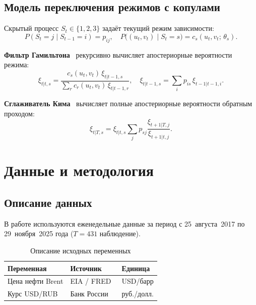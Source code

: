 \section{Модель переключения режимов с копулами}

Скрытый процесс $S_t \in \{1,2,3\}$ задаёт текущий режим зависимости:
\begin{equation}
  P(S_t = j \mid S_{t-1} = i) = p_{ij}, \quad
  P\bigl((u_t, v_t) \mid S_t = s\bigr) = c_s(u_t, v_t;\,\theta_s).
\end{equation}

\textbf{Фильтр Гамильтона}~\autocite{Hamilton1989} рекурсивно вычисляет
апостериорные вероятности режима:
\begin{equation}
  \xi_{t|t,s} =
  \frac{c_s(u_t,v_t)\,\xi_{t|t-1,s}}
       {\sum_{r} c_r(u_t,v_t)\,\xi_{t|t-1,r}}, \quad
  \xi_{t|t-1,s} = \sum_i p_{is}\,\xi_{t-1|t-1,i}.
\end{equation}

\textbf{Сглаживатель Кима}~\autocite{Kim1994} вычисляет полные апостериорные
вероятности обратным проходом:
\begin{equation}
  \xi_{t|T,s} = \xi_{t|t,s}
  \sum_j p_{sj} \frac{\xi_{t+1|T,j}}{\xi_{t+1|t,j}}.
\end{equation}


\chapter{Данные и методология}

\section{Описание данных}

В работе используются еженедельные данные за период
с 25~августа~2017 по 29~ноября~2025 года ($T = 431$ наблюдение).

\begin{table}[h]
\centering
\caption{Описание исходных переменных}
\label{tab:data}
\begin{tabular}{lll}
\toprule
Переменная & Источник & Единица \\
\midrule
Цена нефти Brent & EIA / FRED~\autocite{EIA2024} & USD/барр \\
Курс USD/RUB & Банк России~\autocite{CBR2024} & руб./долл. \\
\bottomrule
\end{tabular}
\end{table}

